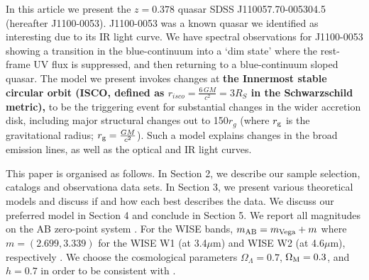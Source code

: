 \documentclass[a4paper,fleqn,usenatbib]{mnras}
\begin{document}
In this article we present the $z=0.378$ quasar SDSS
J110057.70-005304.5 (hereafter J1100-0053).  J1100-0053 was a known
quasar we identified as interesting due to its IR light curve. We have
spectral observations for J1100-0053 showing a transition in the
blue-continuum into a `dim state' where the rest-frame UV flux is
suppressed, and then returning to a blue-continuum sloped quasar.  The
model we present invokes changes at {\bf the Innermost stable circular
orbit (ISCO, defined as $r_{isco}={\frac {6\,GM}{c^{2}}}=3R_{S}$ in
the Schwarzschild metric),} to be the triggering event for substantial 
changes in the wider accretion disk, including major structural
changes out to 150$r_{g}$ (where $r_{\rm g}$ is the gravitational
radius; $r_{\rm g}=\frac{GM}{c^2}$).  Such a model explains changes in
the broad emission lines, as well as the optical and IR light curves.

This paper is organised as follows.  In Section 2, we describe our
sample selection, catalogs and observationa data sets.  In Section 3,
we present various theoretical models and discuss if and how each best
describes the data.  We discuss our preferred model in Section 4 and
conclude in Section 5.  We report all magnitudes on the AB zero-point
system \citep{Oke_Gunn1983, Fukugita1996}.  For the WISE bands,
$m_{\rm AB} = m_{\rm Vega} + m$ where $m = (2.699, 3.339)$ for the
WISE W1 (at 3.4$\mu$m) and WISE W2 (at 4.6$\mu$m), respectively
\citep{Cutri2011}. We choose the cosmological 
parameters $\Omega_{\Lambda} = 0.7$, $\Omega_{\rm M}  = 0.3$, and $h = 0.7$
in order to be consistent with \citet{Shen2011}. 
\end{document}
